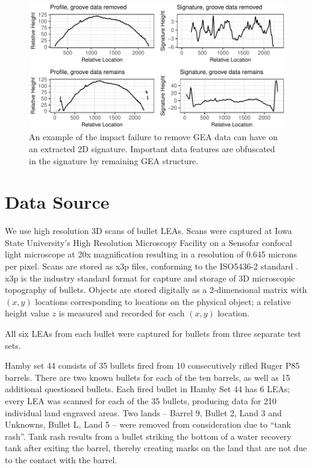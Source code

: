 \documentclass[12pt]{article}
\begin{document}
\begin{figure}
\centering
\includegraphics{writeup_files/figure-latex/groove-no-groove-1.pdf}
\caption{\label{groove-no-groove}An example of the impact failure to
remove GEA data can have on an extracted 2D signature. Important data
features are obfuscated in the signature by remaining GEA structure.}
\end{figure}

\section{Data Source}

We use high resolution 3D scans of bullet LEAs. Scans were captured at
Iowa State University's High Resolution Microscopy Facility on a
Sensofar confocal light microscope at 20x magnification resulting in a
resolution of 0.645 microns per pixel. Scans are stored as x3p files,
conforming to the ISO5436-2 standard \citep{ISO5436}. x3p is the
industry standard format for capture and storage of 3D microscopic
topography of bullets. Objects are stored digitally as a 2-dimensional
matrix with \((x,y)\) locations corresponding to locations on the
physical object; a relative height value \(z\) is measured and recorded
for each \((x,y)\) location.

All six LEAs from each bullet were captured for bullets from three
separate test sets.

Hamby set 44 consists of 35 bullets fired from 10 consecutively rifled
Ruger P85 barrels. There are two known bullets for each of the ten
barrels, as well as 15 additional questioned bullets. Each fired bullet
in Hamby Set 44 has 6 LEAs; every LEA was scanned for each of the 35
bullets, producing data for 210 individual land engraved areas. Two
lands -- Barrel 9, Bullet 2, Land 3 and Unknowns, Bullet L, Land 5 --
were removed from consideration due to ``tank rash''. Tank rash results
from a bullet striking the bottom of a water recovery tank after exiting
the barrel, thereby creating marks on the land that are not due to the
contact with the barrel.
\end{document}
